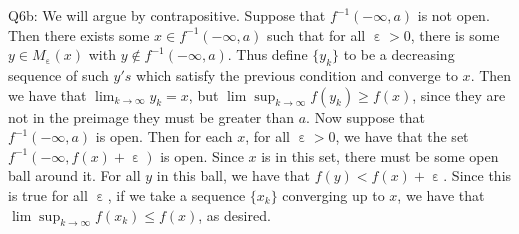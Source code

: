 \documentclass[letterpaper]{article}
\DeclareMathOperator{\ep}{\varepsilon}
\begin{document}
\noindent Q6b: We will argue by contrapositive. Suppose that $f^{-1}(-\infty,a)$ is not open. Then there exists some $x\in f^{-1}(-\infty,a)$ such that for all $\ep>0$, there is some $y \in M_{\ep}(x)$ with $y\notin f^{-1}(-\infty,a)$. Thus define $\{y_k\}$ to be a decreasing sequence of such $y's$ which satisfy the previous condition and converge to $x$. Then we have that $\lim_{k\to \infty}y_k = x$, but $\lim \sup _{k\to \infty} f(y_k) \geq f(x) $, since they are not in the preimage they must be greater than $a$. Now suppose that $f^{-1}(-\infty,a)$ is open. Then for each $x$, for all $\ep>0$, we have that the set $f^{-1}(-\infty,f(x)+\ep)$ is open. Since $x$ is in this set, there must be some open ball around it. For all $y$ in this ball, we have that $f(y)<f(x)+\ep$. Since this is true for all $\ep$, if we take a sequence $\{x_k\}$ converging up to $x$, we have that $\lim \sup_{k\to \infty}f(x_k)\leq f(x)$, as desired. 
\end{document}
